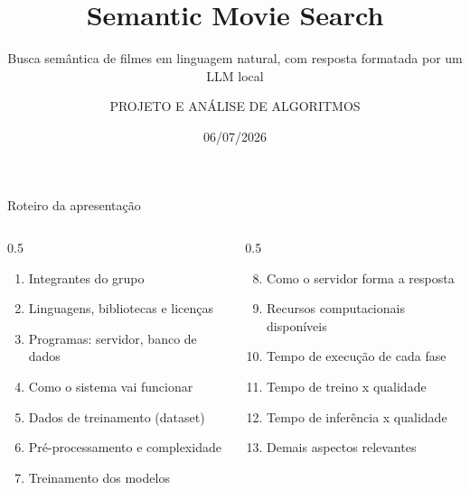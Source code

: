 \documentclass[10pt, aspectratio=169]{beamer}
\title[Semantic Movie Search]{Semantic Movie Search}
\subtitle{Busca semântica de filmes em linguagem natural, com resposta formatada por um LLM local}
\author[PAA - UnB]{PROJETO E ANÁLISE DE ALGORITMOS}
\institute[UnB]{Universidade de Brasília (UnB) \\ 2026.1}
\date{06/07/2026}
\begin{document}
\begin{frame}
    \titlepage
\end{frame}

\begin{frame}{Roteiro da apresentação}
    \vspace{0.5cm}
    \begin{columns}[T]
        \begin{column}{0.5\textwidth}
            \begin{enumerate}
                \item Integrantes do grupo
                \item Linguagens, bibliotecas e licenças
                \item Programas: servidor, banco de dados
                \item Como o sistema vai funcionar
                \item Dados de treinamento (dataset)
                \item Pré-processamento e complexidade
                \item Treinamento dos modelos
            \end{enumerate}
        \end{column}
        \begin{column}{0.5\textwidth}
            \begin{enumerate}
                \setcounter{enumi}{7}
                \item Como o servidor forma a resposta
                \item Recursos computacionais disponíveis
                \item Tempo de execução de cada fase
                \item Tempo de treino x qualidade
                \item Tempo de inferência x qualidade
                \item Demais aspectos relevantes
            \end{enumerate}
        \end{column}
    \end{columns}
\end{frame}
\end{document}
